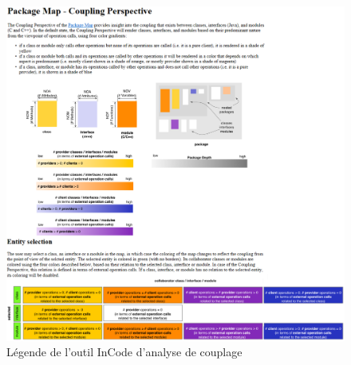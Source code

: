 \documentclass[12pt,a4paper,final]{article}
\begin{document}
\begin{figure}[ht]
	\centering
	\includegraphics[width=\textwidth]{images/InCodeCouplingLegende.png}
	\caption{\label{couplingLeg}Légende de l'outil InCode d'analyse de couplage}
\end{figure}
\end{document}
